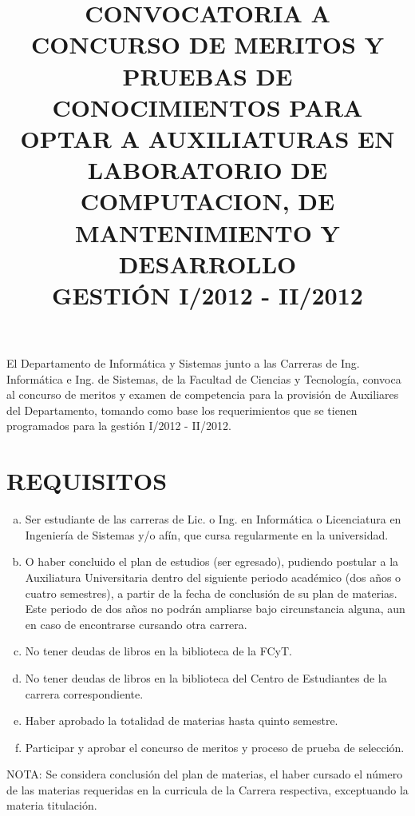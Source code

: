 \documentclass[letterpaper,11pt]{article}
\title{CONVOCATORIA A CONCURSO DE MERITOS Y PRUEBAS DE CONOCIMIENTOS PARA OPTAR A AUXILIATURAS EN LABORATORIO DE COMPUTACION, DE MANTENIMIENTO Y DESARROLLO\\GESTIÓN I/2012 - II/2012\\}
\date{}
\begin{document}
\maketitle
El Departamento de Informática y Sistemas junto a las Carreras de Ing. Informática e Ing. de Sistemas, de la Facultad de Ciencias y Tecnología, convoca al concurso de meritos y examen de competencia para la provisión de Auxiliares del Departamento, tomando como base los requerimientos que se tienen programados para la gestión I/2012 - II/2012.

\section{REQUISITOS}
\begin{enumerate}[a)]
\item Ser estudiante de las carreras de Lic. o Ing. en Informática o Licenciatura en Ingeniería de Sistemas y/o afín, que cursa regularmente en la universidad.
\item O haber concluido el plan de estudios (ser egresado), pudiendo postular a la Auxiliatura Universitaria dentro del siguiente periodo académico (dos años o cuatro semestres), a partir de la fecha de conclusión de su plan de materias. Este periodo de dos años no podrán ampliarse bajo circunstancia alguna, aun en caso de encontrarse cursando otra carrera.
\item No tener deudas de libros en la biblioteca de la FCyT.
\item No tener deudas de libros en la biblioteca del Centro de Estudiantes de la carrera correspondiente.
\item Haber aprobado la totalidad de materias hasta quinto semestre.
\item Participar y aprobar el concurso de meritos y proceso de prueba de selección.
\end{enumerate}

NOTA: Se considera conclusión del plan de materias, el haber cursado el número de las materias requeridas en la curricula de la Carrera respectiva, exceptuando la materia titulación.
\end{document}
